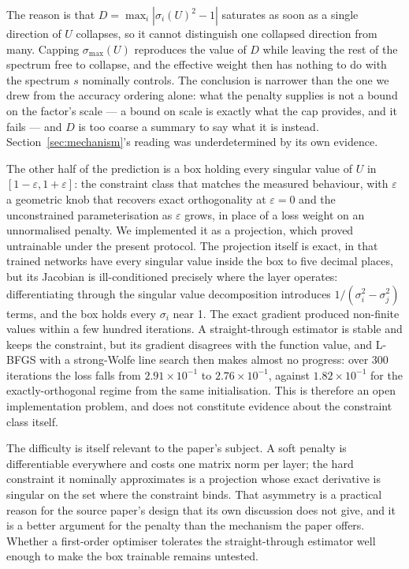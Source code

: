 \documentclass[11pt]{article}
\newcommand{\DU}{D}
\begin{document}
The reason is that $\DU = \max_i |\sigma_i(U)^2 - 1|$ saturates as soon as a
single direction of $U$ collapses, so it cannot distinguish one collapsed
direction from many. Capping $\sigma_{\max}(U)$ reproduces the value of $\DU$
while leaving the rest of the spectrum free to collapse, and the effective
weight then has nothing to do with the spectrum $s$ nominally controls. The
conclusion is narrower than the one we drew from the accuracy ordering alone:
what the penalty supplies is not a bound on the factor's scale --- a bound on
scale is exactly what the cap provides, and it fails --- and $\DU$ is too coarse
a summary to say what it is instead. Section~\ref{sec:mechanism}'s reading was
underdetermined by its own evidence.

The other half of the prediction is a box holding every singular value of $U$
in $[1-\varepsilon, 1+\varepsilon]$: the constraint class that matches the
measured behaviour, with $\varepsilon$ a geometric knob that recovers exact
orthogonality at $\varepsilon = 0$ and the unconstrained parameterisation as
$\varepsilon$ grows, in place of a loss weight on an unnormalised penalty. We
implemented it as a projection, which proved untrainable under the present
protocol. The projection itself is exact, in that trained networks have every
singular value inside the box to five decimal places, but its Jacobian is
ill-conditioned precisely where the layer operates: differentiating through the singular value decomposition introduces
$1/(\sigma_i^2 - \sigma_j^2)$ terms, and the box holds every $\sigma_i$ near 1.
The exact gradient produced non-finite values within a few hundred iterations.
A straight-through estimator is stable and keeps the constraint, but its
gradient disagrees with the function value, and L-BFGS with a strong-Wolfe line
search then makes almost no progress: over 300 iterations the loss falls from
$2.91\times10^{-1}$ to $2.76\times10^{-1}$, against $1.82\times10^{-1}$ for the
exactly-orthogonal regime from the same initialisation. This is therefore an open implementation problem, and does not constitute
evidence about the constraint class itself.

The difficulty is itself relevant to the paper's subject. A soft penalty is
differentiable everywhere and costs one matrix norm per layer; the hard
constraint it nominally approximates is a projection whose exact derivative is
singular on the set where the constraint binds. That asymmetry is a practical
reason for the source paper's design that its own discussion does not give, and
it is a better argument for the penalty than the mechanism the paper offers.
Whether a first-order optimiser tolerates the straight-through estimator well
enough to make the box trainable remains untested.
\end{document}
